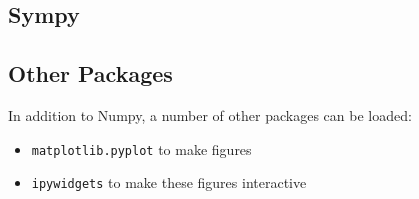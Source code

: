 \subsection{Sympy}

\subsection{Other Packages}
In addition to Numpy, a number of other packages can be loaded:

\begin{itemize}
	\item \lstinline|matplotlib.pyplot| to make figures
	\item \lstinline|ipywidgets| to make these figures interactive
\end{itemize}
